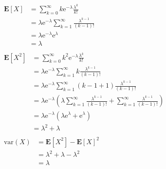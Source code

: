 \documentclass[device=normal, lang=en, fontsize=12pt]{elegantnote}
\numberwithin{equation}{section}
\theoremstyle{definition} %
\begin{document}
\begin{example}
    \begin{align}
    &\begin{aligned}
        \mathbf{E}[X] &= \sum_{k=0}^{\infty} k \mathrm{e}^{-\lambda} \frac{\lambda^{k}}{k!} \\
                      &= \lambda \mathrm{e}^{-\lambda} \sum_{k=1}^{\infty} \frac{\lambda^{k-1}}{(k-1)!} \\
                      &= \lambda \mathrm{e}^{-\lambda} \mathrm{e}^{\lambda} \\
                      &= \lambda
    \end{aligned} \\
    &\begin{aligned}
        \mathbf{E}[X^{2}] &= \sum_{k=0}^{\infty} k^{2} \mathrm{e}^{-\lambda} \frac{\lambda^{k}}{k!} \\
                         &= \lambda \mathrm{e}^{-\lambda} \sum_{k=1}^{\infty} k \frac{\lambda^{k-1}}{(k-1)!} \\
                         &= \lambda \mathrm{e}^{-\lambda} \sum_{k=1}^{\infty} (k-1+1) \frac{\lambda^{k-1}}{(k-1)!} \\
                         &= \lambda \mathrm{e}^{-\lambda} \left(\lambda \sum_{k=1}^{\infty} \frac{\lambda^{k-1}}{(k-1)!} + \sum_{k=1}^{\infty} \frac{\lambda^{k-1}}{(k-1)!}\right) \\
                         &= \lambda \mathrm{e}^{-\lambda} (\lambda \mathrm{e}^{\lambda} + \mathrm{e}^{\lambda}) \\
                         &= \lambda^{2} + \lambda
    \end{aligned} \\
    &\begin{aligned}
        \mathrm{var}(X) &= \mathbf{E}[X^{2}] - \mathbf{E}[X]^{2} \\
                        &= \lambda^{2} + \lambda - \lambda^{2} \\
                        &= \lambda
    \end{aligned}
    \end{align}
\end{example}
\end{document}
